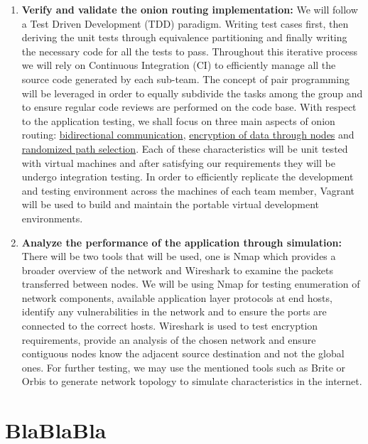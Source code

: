 \documentclass{article}
\begin{document}
\begin{enumerate}
    \item \textbf{Verify and validate the onion routing implementation:} We will follow a Test Driven Development (TDD) paradigm. Writing test cases first, then deriving the unit tests through equivalence partitioning and finally writing the necessary code for all the tests to pass. Throughout this iterative process we will rely on Continuous Integration (CI) to efficiently manage all the source code generated by each sub-team. The concept of pair programming will be leveraged in order to equally subdivide the tasks among the group and to ensure regular code reviews are performed on the code base. With respect to the application testing, we shall focus on three main aspects of onion routing: \underline{bidirectional communication}, \underline{encryption of data through nodes} and \underline{randomized path selection}. Each of these characteristics will be unit tested with virtual machines and after satisfying our requirements they will be undergo integration testing. In order to efficiently replicate the development and testing environment across the machines of each team member, Vagrant will be used to build and maintain the portable virtual development environments.
    \item \textbf{Analyze the performance of the application through simulation:} There will be two tools that will be used, one is Nmap  which provides a broader overview of the network and Wireshark to examine the packets transferred between nodes. We will be using Nmap for testing enumeration of network components, available application layer protocols at end hosts, identify any vulnerabilities in the network and to ensure the ports are connected to the correct hosts. Wireshark is used to test encryption requirements, provide an analysis of the chosen network and ensure contiguous nodes know the adjacent source destination and not the global ones. For further testing, we may use the mentioned tools such as Brite or Orbis to generate network topology to simulate characteristics in the internet.
    

\end{enumerate}


\section*{BlaBlaBla}
\end{document}

